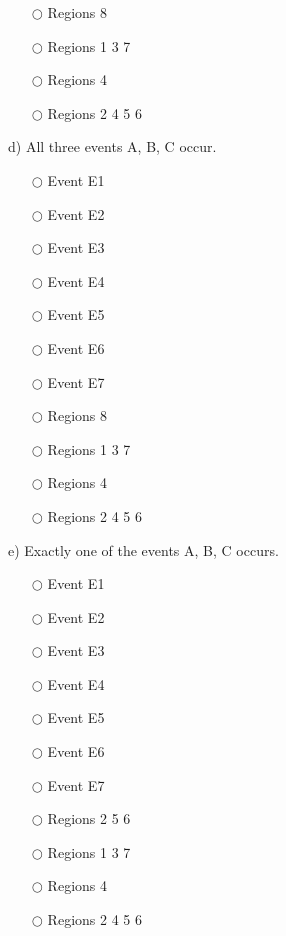 \documentclass[pdftex, brazil, 12pt, twoside]{article}
\begin{document}
\begin{exercise}
  \begin{itemize}[noitemsep]
  \item[$\bigcirc$] Regions 8
  \item[$\bigcirc$] Regions 1 3 7
  \item[$\bigcirc$] Regions 4
  \item[$\bigcirc$] Regions 2 4 5 6
  \end{itemize}

  d) All three events A, B, C occur.
  \begin{itemize}[noitemsep]
  \item[$\bigcirc$] Event E1
  \item[$\bigcirc$] Event E2
  \item[$\bigcirc$] Event E3
  \item[$\bigcirc$] Event E4
  \item[$\bigcirc$] Event E5
  \item[$\bigcirc$] Event E6
  \item[$\bigcirc$] Event E7
  \end{itemize}

  \begin{itemize}[noitemsep]
  \item[$\bigcirc$] Regions 8
  \item[$\bigcirc$] Regions 1 3 7
  \item[$\bigcirc$] Regions 4
  \item[$\bigcirc$] Regions 2 4 5 6
  \end{itemize}

  e) Exactly one of the events A, B, C occurs.
  \begin{itemize}[noitemsep]
  \item[$\bigcirc$] Event E1
  \item[$\bigcirc$] Event E2
  \item[$\bigcirc$] Event E3
  \item[$\bigcirc$] Event E4
  \item[$\bigcirc$] Event E5
  \item[$\bigcirc$] Event E6
  \item[$\bigcirc$] Event E7
  \end{itemize}

  \begin{itemize}[noitemsep]
  \item[$\bigcirc$] Regions 2 5 6
  \item[$\bigcirc$] Regions 1 3 7
  \item[$\bigcirc$] Regions 4
  \item[$\bigcirc$] Regions 2 4 5 6
  \end{itemize}


\end{exercise}
\end{document}
